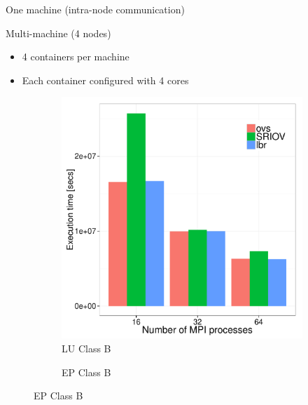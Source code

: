 \documentclass[11pt,xcolor=dvipsnames,presentation]{beamer}
\begin{document}
\begin{frame}[label=sec-3-0-11]{One machine (intra-node communication)}
\begin{figure}
\begin{subfigure}[b]{0.42\textwidth}
  \end{subfigure}
\end{figure}
\end{frame}

\begin{frame}[label=sec-3-0-12]{Multi-machine (4 nodes)}
\begin{itemize}
\item 4 containers per machine
\item Each container configured with 4 cores
\end{itemize}

\begin{figure}
  \centering
  \begin{subfigure}[b]{0.42\textwidth}
    \caption{LU Class B}
    \includegraphics[scale=0.25,angle=0]{figures/inter-container-luB.pdf}
  \end{subfigure}
  \begin{subfigure}[b]{0.42\textwidth}
    \caption{EP Class B}

\end{subfigure}
\end{figure}
\end{frame}
\end{document}

